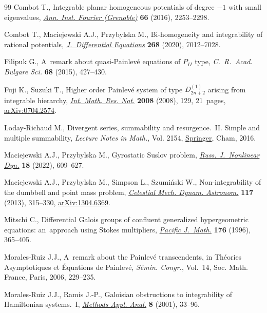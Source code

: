 \documentclass[10pt,a4paper]{amsart}
\numberwithin{equation}{section}
\begin{document}
\begin{thebibliography}{99}
Combot T., Integrable planar homogeneous potentials of degree {$-1$} with small
 eigenvalues, \href{https://doi.org/10.5802/aif.3063}{\textit{Ann. Inst. Fourier (Grenoble)}} \textbf{66} (2016),
 2253--2298.

Combot T., Maciejewski A.J., Przybylska M., Bi-homogeneity and integrability of
 rational potentials, \href{https://doi.org/10.1016/j.jde.2019.11.074}{\textit{J.~Differential Equations}} \textbf{268} (2020),
 7012--7028.

Filipuk G., A~remark about quasi-{P}ainlev\'e equations of {$P_{II}$} type,
 \textit{C.~R.~Acad. Bulgare Sci.} \textbf{68} (2015), 427--430.

Fuji K., Suzuki T., Higher order {P}ainlev\'e system of type {$D^{(1)}_{2n+2}$}
 arising from integrable hierarchy, \href{https://doi.org/10.1093/imrn/rnm129}{\textit{Int. Math. Res. Not.}}
 \textbf{2008} (2008), 129, 21~pages, \href{https://arxiv.org/abs/0704.2574}{arXiv:0704.2574}.

Loday-Richaud M., Divergent series, summability and resurgence.~{II}. {S}imple
 and multiple summability, \textit{Lecture Notes in Math.}, Vol. 2154,
 \href{https://doi.org/10.1007/978-3-319-29075-1}{Springer}, Cham, 2016.

Maciejewski A.J., Przybylska M., Gyrostatic {S}uslov problem, \href{https://doi.org/10.20537/nd221210}{\textit{Russ.
 J.~Nonlinear Dyn.}} \textbf{18} (2022), 609--627.

Maciejewski A.J., Przybylska M., Simpson L., Szumi\'nski W., Non-integrability
 of the dumbbell and point mass problem, \href{https://doi.org/10.1007/s10569-013-9514-7}{\textit{Celestial Mech. Dynam.
 Astronom.}} \textbf{117} (2013), 315--330, \href{https://arxiv.org/abs/1304.6369}{arXiv:1304.6369}.

Mitschi C., Differential {G}alois groups of confluent generalized
 hypergeometric equations: an~approach using {S}tokes multipliers,
 \href{https://doi.org/10.2140/pjm.1996.176.365}{\textit{Pacific J.~Math.}} \textbf{176} (1996), 365--405.

Morales-Ruiz J.J., A~remark about the {P}ainlev\'e transcendents, in Th\'eories
 Asymptotiques et \'Equations de {P}ainlev\'e, \textit{S\'emin. Congr.},
 Vol.~14, Soc. Math. France, Paris, 2006, 229--235.

Morales-Ruiz J.J., Ramis J.-P., Galoisian obstructions to integrability of
 {H}amiltonian systems.~{I}, \href{https://doi.org/10.4310/MAA.2001.v8.n1.a3}{\textit{Methods Appl. Anal.}} \textbf{8} (2001),
 33--96.


\end{thebibliography}
\end{document}
